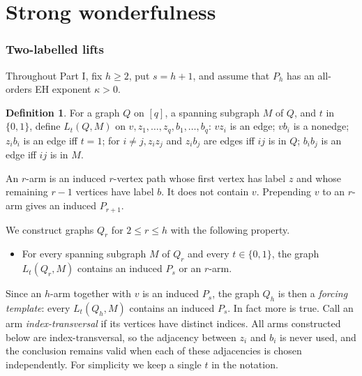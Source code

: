 \documentclass[11pt,a4paper]{article}
\theoremstyle{definition}
\newtheorem{definition}[theorem]{Definition}
\theoremstyle{remark}
\numberwithin{equation}{section}
\begin{document}
\part{Strong wonderfulness}

\section{Two-labelled lifts}\label{sec:lift}
Throughout Part I, fix \(h\ge2\), put \(s=h+1\), and assume that \(P_h\) has an all-orders EH exponent \(\kappa>0\).
\begin{definition}
For a graph \(Q\) on \([q]\), a spanning subgraph \(M\) of \(Q\), and \(t\) in \(\{0,\allowbreak 1\}\), define \(L_{t}(Q,\allowbreak M)\) on \(v,\allowbreak z_{1},\ldots,z_{q},\allowbreak b_{1},\ldots,b_{q}\): \(v z_{i}\) is an edge; \(v b_{i}\) is a nonedge; \(z_{i} b_{i}\) is an edge iff \(t=1\); for \(i\ne j,\allowbreak  z_{i} z_{j}\) and \(z_{i} b_{j}\) are edges iff \(ij\) is in \(Q\); \(b_{i} b_{j}\) is an edge iff \(ij\) is in \(M\).

An \(r\)-arm is an induced \(r\)-vertex path whose first vertex has label \(z\) and whose remaining \(r-1\) vertices have label \(b\). It does not contain \(v\). Prepending \(v\) to an \(r\)-arm gives an induced \(P_{r+1}\).
\end{definition}
We construct graphs \(Q_{r}\) for \(2\le r\le h\) with the following property.
\begin{itemize}
\item[\((\ast)\)] For every spanning subgraph \(M\) of \(Q_{r}\) and every \(t\in\{0,1\}\), the graph \(L_{t}(Q_{r},M)\) contains an induced \(P_{s}\) or an \(r\)-arm.
\end{itemize}
Since an \(h\)-arm together with \(v\) is an induced \(P_s\), the graph \(Q_{h}\) is then a \emph{forcing template}: every \(L_{t}(Q_{h},M)\) contains an induced \(P_{s}\). In fact more is true. Call an arm \emph{index-transversal} if its vertices have distinct indices. All arms constructed below are index-transversal, so the adjacency between \(z_i\) and \(b_i\) is never used, and the conclusion remains valid when each of these adjacencies is chosen independently. For simplicity we keep a single \(t\) in the notation.
\end{document}
